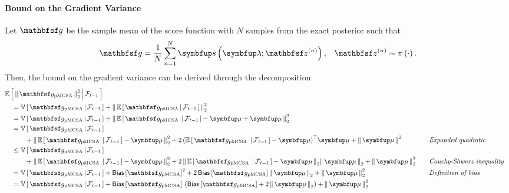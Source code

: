 \begin{proofEnd}
  \paragraph{\textbf{Bound on the Gradient Variance}}
  Let \(\rvvg\) be the sample mean of the score function with \(N\) samples from the exact posterior such that
  \begin{align*}
    &\rvvg = \frac{1}{N} \sum^{N}_{n=1} \vs\left(\vlambda; \rvvz^{(n)}\right),
    &\rvvz^{(n)} \sim \pi\left(\cdot\right).
  \end{align*}
  Then, the bound on the gradient variance can be derived through the decomposition
  {%
  \begin{alignat}{2}
    &\E{ \norm{\rvvg_{\mathrm{pMCSA}}}^2_{2} \,\middle|\, \mathcal{F}_{t-1} }
    \nonumber
    \\
    &\quad=
    \V{ \rvvg_{\mathrm{pMCSA}} \,\middle|\, \mathcal{F}_{t-1}  }
    +
    \norm{ \E{ \rvvg_{\mathrm{pMCSA}} \,\middle|\, \mathcal{F}_{t-1}  } }_2^2
    \nonumber
    \\
    &\quad=
    \V{ \rvvg_{\mathrm{pMCSA}} \,\middle|\, \mathcal{F}_{t-1}  }
    +
    \norm{
      \E{ \rvvg_{\mathrm{pMCSA}}  \;\,\middle|\, \mathcal{F}_{t-1}  } - \vmu  + \vmu
    }_2^2
    \nonumber
    \\
    &\quad=
    \V{ \rvvg_{\mathrm{pMCSA}} \,\middle|\, \mathcal{F}_{t-1}  }
    \nonumber
    \\
    &\quad\qquad+
    \norm{
      \E{ \rvvg_{\mathrm{pMCSA}}  \;\,\middle|\, \mathcal{F}_{t-1}  } - \vmu  
    }_2^2
    \nonumber
    +
    2 \, {\left(
      \E{ \rvvg_{\mathrm{pMCSA}}  \;\,\middle|\, \mathcal{F}_{t-1}  } - \vmu 
    \right)}^{\top}
    \vmu
    + 
    \norm{\vmu}^2
    &&\quad\text{\textit{Expanded quadratic}}
    \nonumber
    \\
    &\quad\leq
    \V{ \rvvg_{\mathrm{pMCSA}} \,\middle|\, \mathcal{F}_{t-1}  }
    \nonumber
    \\
    &\quad\qquad+
    \norm{
      \E{ \rvvg_{\mathrm{pMCSA}}  \;\,\middle|\, \mathcal{F}_{t-1}  } - \vmu 
    }_2^2
    +
    2 \,\norm{
      \E{ \rvvg_{\mathrm{pMCSA}}  \;\,\middle|\, \mathcal{F}_{t-1}  } - \vmu
    }_2
    \norm{\vmu}_2
    + 
    \norm{
      \vmu
    }_2^2
    \nonumber
    &&\quad\text{\textit{Cauchy-Shwarz inequality}}
    \\
    &\quad=
    \V{ \rvvg_{\mathrm{pMCSA}} \,\middle|\, \mathcal{F}_{t-1}  }
    +
    \mathsf{Bias}\left[\rvvg_{\text{pMCSA}}\right]^2
    +
    2 \,\mathsf{Bias}\left[\rvvg_{\text{pMCSA}}\right]
    \norm{\vmu}_2
    + 
    \norm{
      \vmu
    }_2^2
    \nonumber
    &&\quad\text{\textit{Definition of bias}}
    \\
    &\quad=
    \V{ \rvvg_{\mathrm{pMCSA}} \,\middle|\, \mathcal{F}_{t-1}  }
    +
    \mathsf{Bias}\left[\rvvg_{\text{pMCSA}}\right]\,
    \left(
    \mathsf{Bias}\left[\rvvg_{\text{pMCSA}}\right]
    +
    2\,\norm{\vmu}_2
    \right)
    + 
    \norm{
      \vmu
    }_2^2
    \nonumber
  \end{alignat}
  }


\end{proofEnd}

